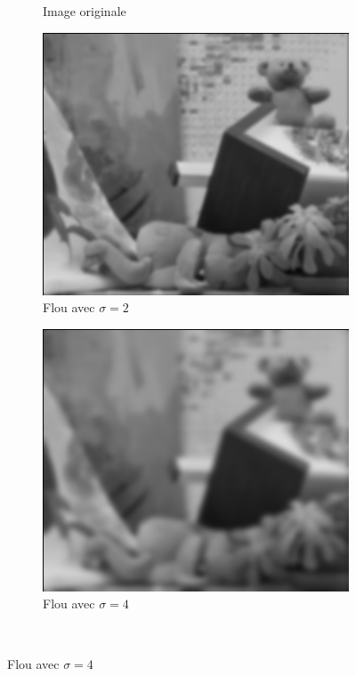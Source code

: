 \begin{enumerate}[questions, start=11]
\begin{figure}[!h]
\begin{subfigure}{0.3\textwidth}
  \caption{Image originale}
  \end{subfigure}\hfill
  \begin{subfigure}{0.3\textwidth}
  \includegraphics[width=\textwidth]{img/teddy-blur-2.png}
  \caption{Flou avec $\sigma = 2$}
  \end{subfigure}\hfill
  \begin{subfigure}{0.3\textwidth}
  \includegraphics[width=\textwidth]{img/teddy-blur-4.png}
  \caption{Flou avec $\sigma = 4$}
  \end{subfigure}\\
  

\end{figure}
\end{enumerate}
